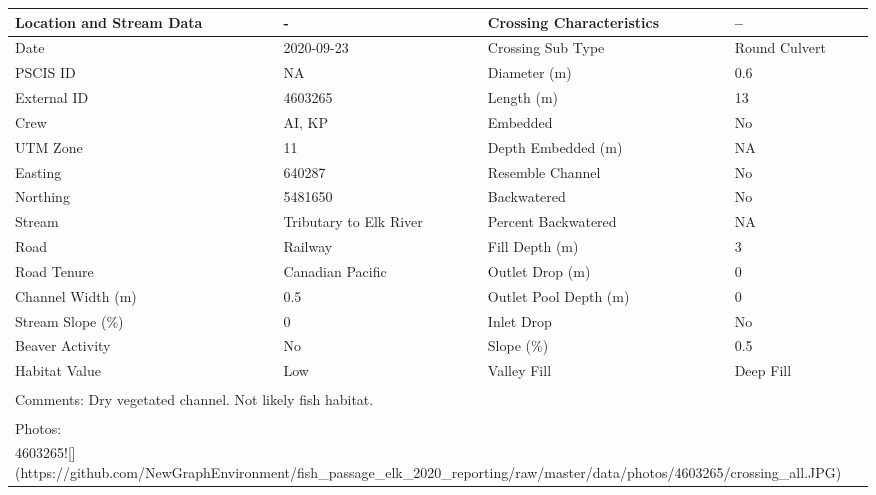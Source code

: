 \documentclass[
]{book}
\begin{document}
\begin{tabular}{l|l|l|l}
\hline
Location and Stream Data & - & Crossing Characteristics & --\\
\hline
Date & 2020-09-23 & Crossing Sub Type & Round Culvert\\
\hline
PSCIS ID & NA & Diameter (m) & 0.6\\
\hline
External ID & 4603265 & Length (m) & 13\\
\hline
Crew & AI, KP & Embedded & No\\
\hline
UTM Zone & 11 & Depth Embedded (m) & NA\\
\hline
Easting & 640287 & Resemble Channel & No\\
\hline
Northing & 5481650 & Backwatered & No\\
\hline
Stream & Tributary to Elk River & Percent Backwatered & NA\\
\hline
Road & Railway & Fill Depth (m) & 3\\
\hline
Road Tenure & Canadian Pacific & Outlet Drop (m) & 0\\
\hline
Channel Width (m) & 0.5 & Outlet Pool Depth (m) & 0\\
\hline
Stream Slope (\%) & 0 & Inlet Drop & No\\
\hline
Beaver Activity & No & Slope (\%) & 0.5\\
\hline
Habitat Value & Low & Valley Fill & Deep Fill\\
\hline
\multicolumn{4}{l}{\textsuperscript{} Comments: Dry vegetated channel. Not likely fish habitat.}\\
\multicolumn{4}{l}{\textsuperscript{} Photos:}\\
\multicolumn{4}{l}{4603265![](https://github.com/NewGraphEnvironment/fish\_passage\_elk\_2020\_reporting/raw/master/data/photos/4603265/crossing\_all.JPG)}\\
\end{tabular}
\end{document}
